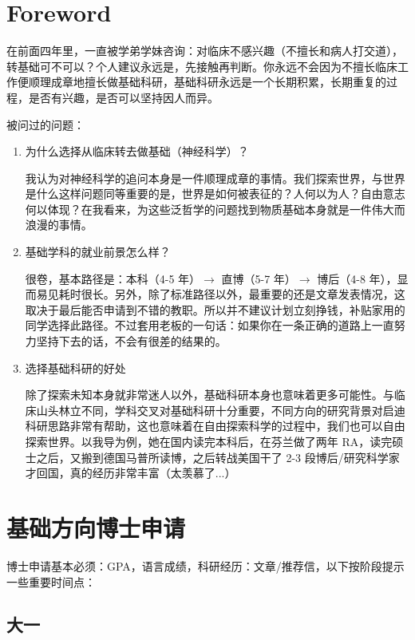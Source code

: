 \documentclass[zihao=-4,fontset=none]{Beautybook-CN}
\begin{document}
\section{Foreword}

在前面四年里，一直被学弟学妹咨询：对临床不感兴趣（不擅长和病人打交道），转基础可不可以？个人建议永远是，先接触再判断。你永远不会因为不擅长临床工作便顺理成章地擅长做基础科研，基础科研永远是一个长期积累，长期重复的过程，是否有兴趣，是否可以坚持因人而异。

被问过的问题：
\begin{enumerate}
    \item 为什么选择从临床转去做基础（神经科学）？

我认为对神经科学的追问本身是一件顺理成章的事情。我们探索世界，与世界是什么这样问题同等重要的是，世界是如何被表征的？人何以为人？自由意志何以体现？在我看来，为这些泛哲学的问题找到物质基础本身就是一件伟大而浪漫的事情。
\item 基础学科的就业前景怎么样？

很卷，基本路径是：本科（4-5 年）${\rightarrow}$ 直博（5-7 年）${\rightarrow}$ 博后（4-8 年），显而易见耗时很长。另外，除了标准路径以外，最重要的还是文章发表情况，这取决于最后能否申请到不错的教职。所以并不建议计划立刻挣钱，补贴家用的同学选择此路径。不过套用老板的一句话：如果你在一条正确的道路上一直努力坚持下去的话，不会有很差的结果的。
\item 选择基础科研的好处

除了探索未知本身就非常迷人以外，基础科研本身也意味着更多可能性。与临床山头林立不同，学科交叉对基础科研十分重要，不同方向的研究背景对启迪科研思路非常有帮助，这也意味着在自由探索科学的过程中，我们也可以自由探索世界。以我导为例，她在国内读完本科后，在芬兰做了两年 RA，读完硕士之后，又搬到德国马普所读博，之后转战美国干了 2-3 段博后/研究科学家才回国，真的经历非常丰富（太羡慕了...）
\end{enumerate}

\section{基础方向博士申请}

博士申请基本必须：GPA，语言成绩，科研经历：文章/推荐信，以下按阶段提示一些重要时间点：

\subsection{大一}
\end{document}

